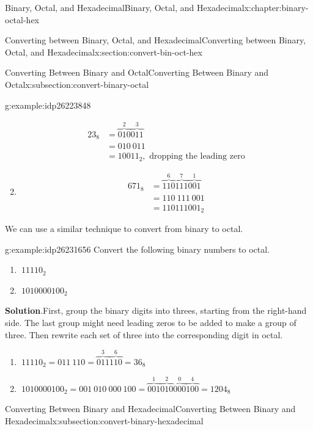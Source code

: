 \documentclass[twoside,10pt,]{book}
\newcommand{\blocktitlefont}{\relax}
\numberwithin{equation}{section}
\newcommand{\amp}{&}
\begin{document}
\begin{chapterptx}{Binary, Octal, and Hexadecimal}{}{Binary, Octal, and Hexadecimal}{}{}{x:chapter:binary-octal-hex}
\begin{sectionptx}{Converting between Binary, Octal, and Hexadecimal}{}{Converting between Binary, Octal, and Hexadecimal}{}{}{x:section:convert-bin-oct-hex}
\begin{subsectionptx}{Converting Between Binary and Octal}{}{Converting Between Binary and Octal}{}{}{x:subsection:convert-binary-octal}
\begin{example}{}{g:example:idp26223848}
\begin{enumerate}
\begin{align*}
23_8 \amp = \overbrace{010}^2\overbrace{011}^3\\
\amp = 010\ 011\\
\amp = 10011_2,\text{ dropping the leading zero}
\end{align*}
%
\item{}%
\begin{align*}
671_8 \amp = \overbrace{110}^6\overbrace{111}^7\overbrace{001}^1\\
\amp = 110\ 111\ 001\\
\amp = 110111001_2
\end{align*}
%
\end{enumerate}
\end{example}
%
\par
We can use a similar technique to convert from binary to octal.  \begin{example}{}{g:example:idp26231656}%
Convert the following binary numbers to octal. %
\begin{enumerate}
\item{}\(\displaystyle \ 11110_2\)%
\item{}\(\displaystyle \ 1010000100_2\)%
\end{enumerate}
\par\smallskip%
\noindent\textbf{\blocktitlefont Solution}.\label{g:solution:idp26230888}{}\hypertarget{g:solution:idp26230888}{}\quad{}First, group the binary digits into threes, starting from the right-hand side.  The last group might need leading zeros to be added to make a group of three.  Then rewrite each set of three into the corresponding digit in octal. %
\begin{enumerate}
\item{}\(\displaystyle \ 11110_2=011\ 110=\overbrace{011}^3\overbrace{110}^6=36_8\)%
\item{}\(\displaystyle \ 1010000100_2=001\ 010\ 000\ 100=\overbrace{001}^1\overbrace{010}^2\overbrace{000}^0\overbrace{100}^4=1204_8\)%
\end{enumerate}
\end{example}
%
\end{subsectionptx}
%
%
\typeout{************************************************}
\typeout{************************************************}
%
\begin{subsectionptx}{Converting Between Binary and Hexadecimal}{}{Converting Between Binary and Hexadecimal}{}{}{x:subsection:convert-binary-hexadecimal}

\end{subsectionptx}
\end{sectionptx}
\end{chapterptx}
\end{document}
